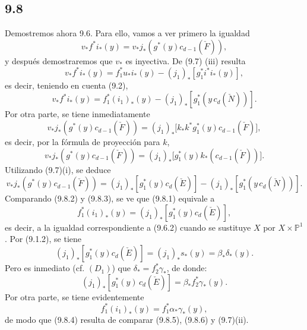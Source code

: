 \subsection*{9.8}

Demostremos ahora 9.6. Para ello, vamos a ver primero la igualdad
\[
v_*f^*i_*(y)=v_*j_*(g^*(y)c_{d-1}(\check F)),
\tag{9.8.1}
\]
y después demostraremos que $v_*$ es inyectiva. De (9.7) (iii) resulta
\[
v_*f^*i_*(y)=f_1^*u_*i_*(y)-(j_1)_*[g_1^*i^*i_*(y)],
\]
es decir, teniendo en cuenta (9.2),
\[
v_*f^*i_*(y)=f_1^*(i_1)_*(y)-(j_1)_*[g_1^*(y\,c_d(\check N))].
\tag{9.8.2}
\]
Por otra parte, se tiene inmediatamente
\[
v_*j_*(g^*(y)c_{d-1}(\check F))
=(j_1)_*\bigl[k_*k^*g_1^*(y)c_{d-1}(\check F)\bigr],
\]
es decir, por la fórmula de proyección para $k$,
\[
v_*j_*(g^*(y)c_{d-1}(\check F))
=(j_1)_*\bigl[g_1^*(y)k_*(c_{d-1}(\check F))\bigr].
\]
Utilizando (9.7)(i), se deduce
\[
v_*j_*(g^*(y)c_{d-1}(\check F))
=(j_1)_*[g_1^*(y)c_d(\check E)]-(j_1)_*[g_1^*(y\,c_d(\check N))].
\tag{9.8.3}
\]
Comparando (9.8.2) y (9.8.3), se ve que (9.8.1) equivale a
\[
f_1^*(i_1)_*(y)=(j_1)_*[g_1^*(y)c_d(\check E)],
\tag{9.8.4}
\]
es decir, a la igualdad correspondiente a (9.6.2) cuando se sustituye $X$ por $X\times\mathbb P^1$. Por (9.1.2), se tiene
\[
(j_1)_*[g_1^*(y)c_d(\check E)]=(j_1)_*s_*(y)=\beta_*\delta_*(y).
\]
Pero es inmediato (cf. $(D_1)$) que $\delta_*=f_2^*\gamma_*$, de donde:
\[
(j_1)_*[g_1^*(y)\,c_d(\check E)]=\beta_*f_2^*\gamma_*(y).
\tag{9.8.5}
\]
Por otra parte, se tiene evidentemente
\[
f_1^*(i_1)_*(y)=f_1^*\alpha_*\gamma_*(y),
\tag{9.8.6}
\]
de modo que (9.8.4) resulta de comparar (9.8.5), (9.8.6) y (9.7)(ii).
